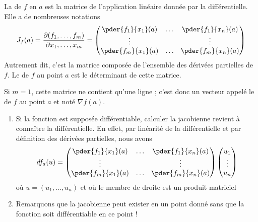 \begin{definition}
    La  de $f$ en $a$ est la matrice de l'application linéaire donnée par la différentielle. Elle a de nombreuses notations
  \begin{equation}
      J_f(a) = \frac{ \partial (f_1,\ldots, f_m) }{ \partial x_1,\ldots, x_m }=
    \begin{pmatrix}
      \pder {f_1} {x_1}(a) & \ldots &\pder {f_1} {x_n}(a)\\
      \vdots& & \vdots\\
      \pder {f_m} {x_1}(a) & \ldots &\pder {f_m} {x_n}(a)
    \end{pmatrix}
  \end{equation}
  Autrement dit, c'est la matrice composée de l'ensemble des dérivées partielles de $f$. Le  de \( f\) au point \( a\) est le déterminant de cette matrice.

  Si $m = 1$, cette matrice ne contient qu'une ligne ; c'est donc un vecteur appelé le  de $f$ au point $a$ et noté $\nabla f(a)$.
\end{definition}

\begin{remark}
  \begin{enumerate}
  \item Si la fonction est supposée différentiable, calculer la
    jacobienne revient à connaître la différentielle. En effet, par
    linéarité de la différentielle et par définition des dérivées
    partielles, nous avons
    \begin{equation*}
      d f_a (u) =%
      \begin{pmatrix}
        \pder {f_1} {x_1}(a) & \ldots &\pder {f_1} {x_n}(a)\\
        \vdots& & \vdots\\
        \pder {f_m} {x_1}(a) & \ldots &\pder {f_m} {x_n}(a)
      \end{pmatrix}
      \begin{pmatrix}u_1\\\vdots\\u_n\end{pmatrix}
    \end{equation*}
    où $u = (u_1, \ldots, u_n)$ et où le membre de droite est un
    produit matriciel

  \item Remarquons que la jacobienne peut exister en un point donné
    sans que la fonction soit différentiable en ce point !
  \end{enumerate}
\end{remark}
